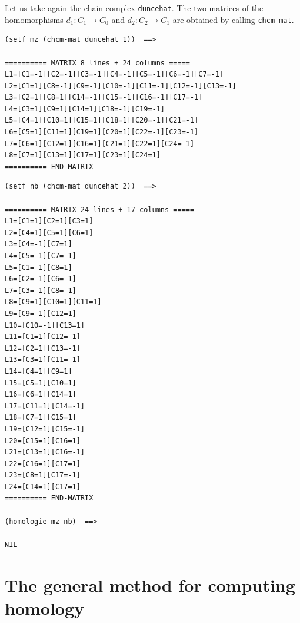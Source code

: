Let us take again  the chain complex {\tt duncehat}.
The two matrices of the homomorphisms $d_1: C_1 \rightarrow C_0$ and
$d_2: C_2 \rightarrow C_1$ are obtained by calling {\tt chcm-mat}.
{\footnotesize\begin{verbatim}
(setf mz (chcm-mat duncehat 1))  ==>

========== MATRIX 8 lines + 24 columns =====
L1=[C1=-1][C2=-1][C3=-1][C4=-1][C5=-1][C6=-1][C7=-1]
L2=[C1=1][C8=-1][C9=-1][C10=-1][C11=-1][C12=-1][C13=-1]
L3=[C2=1][C8=1][C14=-1][C15=-1][C16=-1][C17=-1]
L4=[C3=1][C9=1][C14=1][C18=-1][C19=-1]
L5=[C4=1][C10=1][C15=1][C18=1][C20=-1][C21=-1]
L6=[C5=1][C11=1][C19=1][C20=1][C22=-1][C23=-1]
L7=[C6=1][C12=1][C16=1][C21=1][C22=1][C24=-1]
L8=[C7=1][C13=1][C17=1][C23=1][C24=1]
========== END-MATRIX
\end{verbatim}}
\newpage
{\footnotesize\begin{verbatim}
(setf nb (chcm-mat duncehat 2))  ==>

========== MATRIX 24 lines + 17 columns =====
L1=[C1=1][C2=1][C3=1]
L2=[C4=1][C5=1][C6=1]
L3=[C4=-1][C7=1]
L4=[C5=-1][C7=-1]
L5=[C1=-1][C8=1]
L6=[C2=-1][C6=-1]
L7=[C3=-1][C8=-1]
L8=[C9=1][C10=1][C11=1]
L9=[C9=-1][C12=1]
L10=[C10=-1][C13=1]
L11=[C1=1][C12=-1]
L12=[C2=1][C13=-1]
L13=[C3=1][C11=-1]
L14=[C4=1][C9=1]
L15=[C5=1][C10=1]
L16=[C6=1][C14=1]
L17=[C11=1][C14=-1]
L18=[C7=1][C15=1]
L19=[C12=1][C15=-1]
L20=[C15=1][C16=1]
L21=[C13=1][C16=-1]
L22=[C16=1][C17=1]
L23=[C8=1][C17=-1]
L24=[C14=1][C17=1]
========== END-MATRIX

(homologie mz nb)  ==>

NIL
\end{verbatim}}
\newpage

\section {The general method for computing homology}

